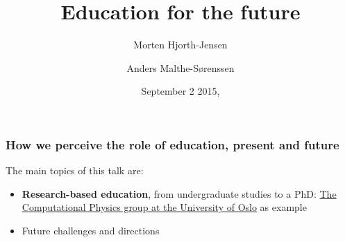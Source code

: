 \documentclass{beamer}
\begin{document}







\title{Education for the future}


\author{Morten Hjorth-Jensen
\and
Anders Malthe-Sørenssen}

\date{September 2 2015, 
}

\begin{frame}
\titlepage
\end{frame}

\begin{frame}
\frametitle{How we perceive the role of education, present and future}

\begin{block}{}
The main topics of this talk are:

\begin{itemize}
\item \textbf{Research-based education}, from undergraduate studies to a PhD: \href{{http://www.mn.uio.no/fysikk/english/research/groups/computational/index.html}}{The Computational Physics group at the University of Oslo} as example

\item Future challenges and directions
\end{itemize}

\noindent
\end{block}
\end{frame}
\end{document}
